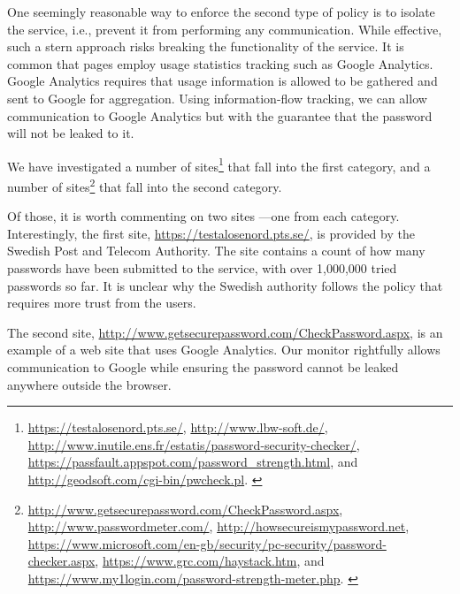 \documentclass{llncs}
\begin{document}
One seemingly reasonable way to enforce the second type of policy is to
isolate the service, i.e., prevent it from performing any communication.
While effective, such a stern approach risks breaking the functionality of the service.
It is common that pages employ usage statistics tracking such as Google
Analytics. Google Analytics requires that usage information is allowed to be gathered and
sent to Google for aggregation. Using information-flow tracking, we
can allow communication to Google Analytics but with the guarantee
that the password will not be leaked to it.

We have investigated a number of sites\footnote{\scriptsize{
\url{https://testalosenord.pts.se/},
\url{http://www.lbw-soft.de/},
\url{http://www.inutile.ens.fr/estatis/password-security-checker/},
\url{https://passfault.appspot.com/password_strength.html}, and
\url{http://geodsoft.com/cgi-bin/pwcheck.pl}.
}
}
that fall into the first category, and a number of sites\footnote{\scriptsize{
\url{http://www.getsecurepassword.com/CheckPassword.aspx},
\url{http://www.passwordmeter.com/},
\url{http://howsecureismypassword.net},
\url{https://www.microsoft.com/en-gb/security/pc-security/password-checker.aspx},
\url{https://www.grc.com/haystack.htm}, and
\url{https://www.my1login.com/password-strength-meter.php}.
}
}
that fall into the second category.

Of those, it is worth commenting on two sites ---one from each category.  Interestingly, the first
site, {\footnotesize{\url{https://testalosenord.pts.se/}}}, is provided by
the Swedish Post and Telecom Authority. The site contains a count of how many
passwords have been submitted to the service, with over 1,000,000 tried
passwords so far. It is unclear why the Swedish authority follows the policy
that requires more trust from the users.

The second
site, {\footnotesize{\url{http://www.getsecurepassword.com/CheckPassword.aspx}}}, is
an example of a web site that uses Google Analytics. Our monitor rightfully
allows communication to Google while ensuring the password cannot be leaked
anywhere outside the browser. 
\end{document}
